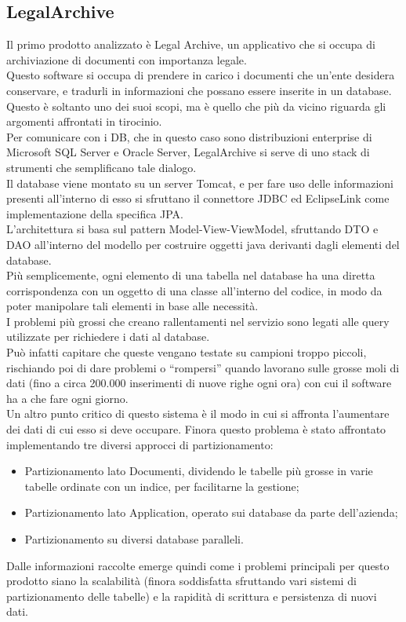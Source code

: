 \subsection{LegalArchive}
Il primo prodotto analizzato è Legal Archive, un applicativo che si occupa di archiviazione di documenti con importanza legale.\\
Questo software si occupa di prendere in carico i documenti che un'ente desidera conservare, e tradurli in informazioni che possano essere inserite in un database.\\
Questo è soltanto uno dei suoi scopi, ma è quello che più da vicino riguarda gli argomenti affrontati in tirocinio.\\
Per comunicare con i DB, che in questo caso sono distribuzioni enterprise di Microsoft SQL Server e Oracle Server, LegalArchive si serve di uno stack di strumenti che semplificano tale dialogo.\\
Il database viene montato su un server Tomcat, e per fare uso delle informazioni presenti all'interno di esso si sfruttano il connettore JDBC ed EclipseLink come implementazione della specifica JPA.\\
L'architettura si basa sul pattern Model-View-ViewModel, sfruttando DTO e DAO all'interno del modello per costruire oggetti java derivanti dagli elementi del database.\\
Più semplicemente, ogni elemento di una tabella nel database ha una diretta corrispondenza con un oggetto di una classe all'interno del codice, in modo da poter manipolare tali elementi in base alle necessità.\\
I problemi più grossi che creano rallentamenti nel servizio sono legati alle query utilizzate per richiedere i dati al database.\\
Può infatti capitare che queste vengano testate su campioni troppo piccoli, rischiando poi di dare problemi o ``rompersi'' quando lavorano sulle grosse moli di dati (fino a circa 200.000 inserimenti di nuove righe ogni ora) con cui il software ha a che fare ogni giorno.\\
Un altro punto critico di questo sistema è il modo in cui si affronta l'aumentare dei dati di cui esso si deve occupare. Finora questo problema è stato affrontato implementando tre diversi approcci di partizionamento:
\begin{itemize}
    \item Partizionamento lato Documenti, dividendo le tabelle più grosse in varie tabelle ordinate con un indice, per facilitarne la gestione;
    \item Partizionamento lato Application, operato sui database da parte dell'azienda;
    \item Partizionamento su diversi database paralleli.
\end{itemize}
Dalle informazioni raccolte emerge quindi come i problemi principali per questo prodotto siano la scalabilità (finora soddisfatta sfruttando vari sistemi di partizionamento delle tabelle) e la rapidità di scrittura e persistenza di nuovi dati.

